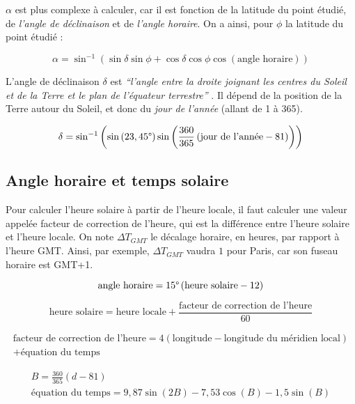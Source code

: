 \documentclass[12pt]{article}
\begin{document}
$\alpha$ est plus complexe à calculer, car il est fonction de la latitude du point étudié, de \emph{l'angle de déclinaison} et de \emph{l'angle horaire}.
On a ainsi, pour $\phi$ la latitude du point étudié  \cite{pos_elevation_angle} :

\[
	\alpha = \sin^{-1} \left(
		\sin \delta \sin \phi +
		\cos \delta \cos \phi \cos \left( \text{angle horaire} \right)
	\right)
\]

L'angle de déclinaison $\delta$ est \emph{``l'angle entre la droite joignant les centres du Soleil et de la Terre et le plan de l'équateur terrestre''} \cite{mouvement_terre}. Il dépend de la position de la Terre autour du Soleil, et donc du \emph{jour de l'année} (allant de 1 à 365).

\[
	\delta = \sin^{-1} \left(
		\sin \left( 23,45\degree \right)
		\sin \left(
			\frac{360}{365}
			\left(
				\text{jour de l'année} - 81
			\right)
		\right)
	\right)
\]



\subsection{Angle horaire et temps solaire}

Pour calculer l'heure solaire à partir de l'heure locale, il faut calculer une valeur appelée facteur de correction de l'heure, qui est la différence entre l'heure solaire et l'heure locale.
On note $\Delta T_{GMT}$ le décalage horaire, en heures, par rapport à l'heure GMT.
Ainsi, par exemple, $\Delta T_{GMT}$ vaudra $1$ pour Paris, car son fuseau horaire est GMT+1.

\[
	\text{angle horaire} = 15 \degree \left(
		\text{heure solaire} - 12
	\right)
\]

\[
	\text{heure solaire} = \text{heure locale} + \frac{\text{facteur de correction de l'heure}}{60}
\]

\begin{multline*}
	\text{facteur de correction de l'heure} = 4 \left( \text{longitude} - \text{longitude du méridien local} \right) \\ + \text{équation du temps}
\end{multline*}

\begin{gather*}
	B = \frac{360}{365} \left( d - 81 \right) \\
	\text{équation du temps} = 9,87 \sin \left( 2B \right) - 7,53 \cos \left( B \right) - 1,5 \sin \left( B \right)
\end{gather*}
\end{document}
